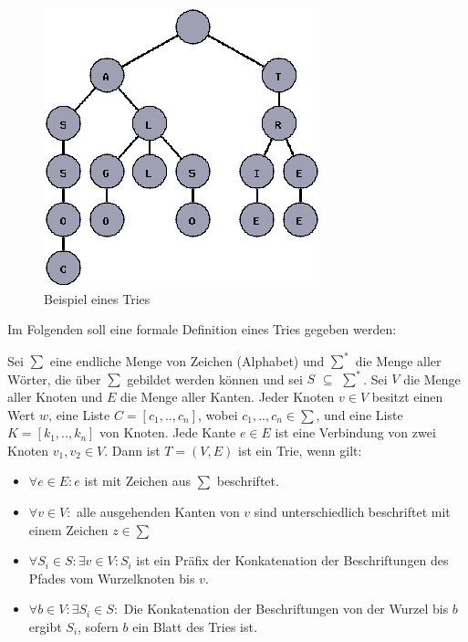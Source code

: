 \begin{figure}[H]
	\centering
	\includegraphics[scale=0.7]{../Abbildungen/trie.png}
	\caption{Beispiel eines Tries \cite{trie_Abb}}
\end{figure}

\newpage
Im Folgenden soll eine formale Definition eines Tries gegeben werden:
\newline
\begin{defi}
	Sei $\sum$ eine endliche Menge von Zeichen (Alphabet) und $\sum^{*}$ die Menge aller Wörter, die über $\sum$ gebildet werden können und sei $S$ $\subseteq$ $\sum^{*}$. Sei $V$ die Menge aller Knoten und $E$ die Menge aller Kanten. Jeder Knoten $v \in V$ besitzt einen Wert $w$, eine Liste $C = [c_1, .., c_n]$, wobei $c_1, .., c_n \in \sum$, und eine Liste $K = [k_1, .., k_n]$ von Knoten. Jede Kante $e \in E$ ist eine Verbindung von zwei Knoten $v_1, v_2 \in V$. Dann ist $T = (V, E)$ ist ein Trie, wenn gilt:
	
	\begin{itemize}
		\item $\forall e \in E: e$ ist mit Zeichen aus $\sum$ beschriftet.
		\item $\forall v \in V:$ alle ausgehenden Kanten von $v$ sind unterschiedlich beschriftet mit einem Zeichen $z \in \sum$
		\item $\forall S_i \in S: \exists v \in V: S_i$ ist ein Präfix der Konkatenation der Beschriftungen des Pfades vom Wurzelknoten bis $v$.
		\item $\forall b \in V: \exists S_i \in S:$ Die Konkatenation der Beschriftungen von der Wurzel bis $b$ ergibt $S_i$, sofern $b$ ein Blatt des Tries ist.
	\end{itemize}
	
\end{defi}

